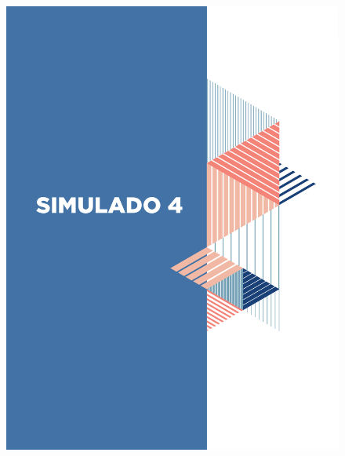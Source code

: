 \begin{figure}[htpb!]
\vspace*{-3cm}
\hspace*{-2.5cm}\includegraphics[scale=1]{../watermarks/4simulado9ano.pdf}
\end{figure}





